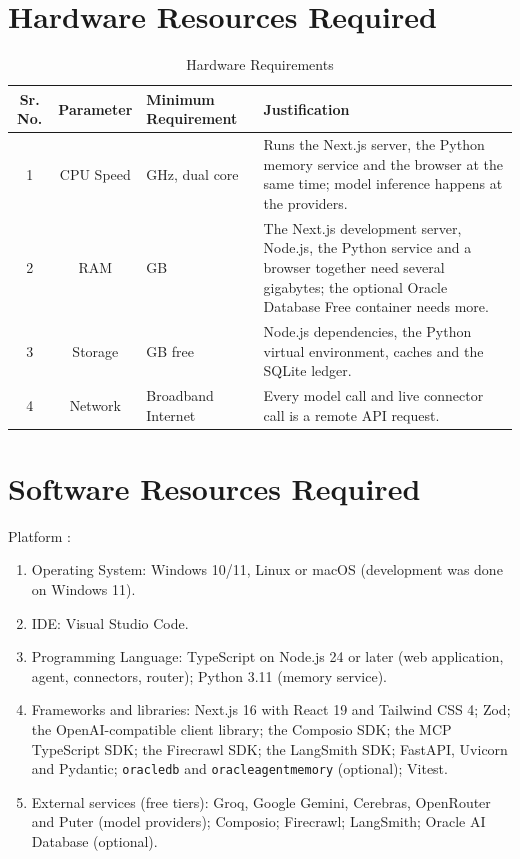 \documentclass[oneside,a4paper,12pt]{report}
\begin{document}
\section{Hardware Resources Required}
\begin{table}[!htbp]
\begin{center}
\def\arraystretch{1.5}
  \begin{tabular}{| c | c | >{\centering\arraybackslash}p{2.6cm} | p{5cm} |}
\hline
Sr. No. &	Parameter &	Minimum Requirement & Justification \\
\hline
1 &	CPU Speed &	 2 GHz, dual core  & Runs the Next.js server, the Python memory service and the browser at the same time; model inference happens at the providers. \\
\hline
2 &	RAM  &	8 GB &  The Next.js development server, Node.js, the Python service and a browser together need several gigabytes; the optional Oracle Database Free container needs more. \\
 \hline
3 & Storage & 5 GB free & Node.js dependencies, the Python virtual environment, caches and the SQLite ledger. \\
\hline
4 & Network & Broadband Internet & Every model call and live connector call is a remote API request. \\
\hline
\end{tabular}
 \caption { Hardware Requirements }
 \label{tab:hreq}
\end{center}

\end{table}


\section{Software Resources Required}
Platform :
\begin{enumerate}
\item Operating System: Windows 10/11, Linux or macOS (development was done on Windows 11).
\item IDE: Visual Studio Code.
\item Programming Language: TypeScript on Node.js 24 or later (web application, agent, connectors, router); Python 3.11 (memory service).
\item Frameworks and libraries: Next.js 16 with React 19 and Tailwind CSS 4; Zod; the OpenAI-compatible client library; the Composio SDK; the MCP TypeScript SDK; the Firecrawl SDK; the LangSmith SDK; FastAPI, Uvicorn and Pydantic; \texttt{oracledb} and \texttt{oracleagentmemory} (optional); Vitest.
\item External services (free tiers): Groq, Google Gemini, Cerebras, OpenRouter and Puter (model providers); Composio; Firecrawl; LangSmith; Oracle AI Database (optional).
\end{enumerate}
\end{document}
